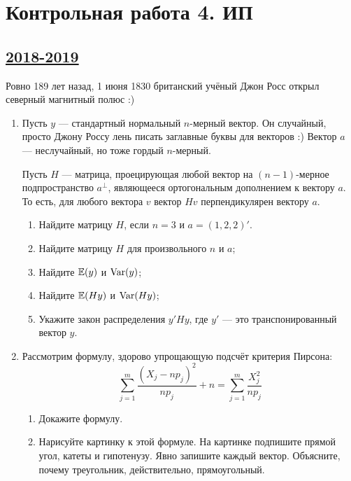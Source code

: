 \newpage
\thispagestyle{empty}
\section{Контрольная работа 4. ИП}


\subsection[2018-2019]{\hyperref[sec:sol_kr_04_ip_2018_2019]{2018-2019}}
\label{sec:kr_04_ip_2018_2019}

Ровно 189 лет назад, 1 июня 1830 британский учёный Джон Росс открыл северный магнитный полюс :)


\begin{enumerate}
\item Пусть $y$ — стандартный нормальный $n$-мерный вектор. 
Он случайный, просто Джону Россу лень писать заглавные буквы для векторов :) 
Вектор $a$ — неслучайный, но тоже гордый $n$-мерный.

Пусть $H$ — матрица, проецирующая любой вектор на $(n-1)$-мерное подпространство $a^{\perp}$, 
являющееся ортогональным дополнением к вектору $a$. 
То есть, для любого вектора $v$ вектор $Hv$ перпендикулярен вектору $a$.

\begin{enumerate}
    \item Найдите матрицу $H$, если $n=3$ и $a=(1,2,2)'$.
    \item Найдите матрицу $H$ для произвольного $n$ и $a$;
    \item Найдите $\operatorname{\mathbb{E}}(y)$ и $\operatorname{Var}(y)$;
    \item Найдите $\operatorname{\mathbb{E}}(Hy)$ и $\operatorname{Var}(Hy)$;
    \item Укажите закон распределения $y'Hy$, где $y'$ — это транспонированный вектор $y$.
\end{enumerate}

\item Рассмотрим формулу, здорово упрощающую подсчёт критерия Пирсона:
\[
 \sum_{j=1}^m \frac{(X_j - np_j)^2}{np_j} + n = \sum_{j=1}^m \frac{X_j^2}{np_j}
\]

\begin{enumerate}
    \item Докажите формулу.
    \item Нарисуйте картинку к этой формуле. На картинке подпишите прямой угол, катеты и гипотенузу. 
    Явно запишите каждый вектор. Объясните, почему треугольник, действительно, прямоугольный. 
\end{enumerate}



\end{enumerate}
